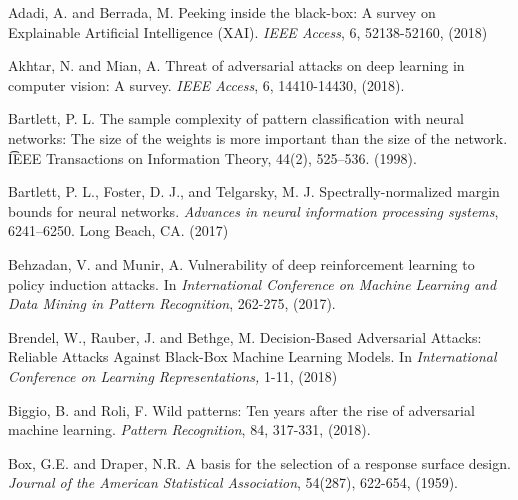 \documentclass[12pt]{article}
\begin{document}

\begin{thebibliography}{}
%

Adadi, A. and Berrada, M. Peeking inside the black-box: A survey on
Explainable Artificial Intelligence (XAI). {\it IEEE Access}, 6,
52138-52160, (2018)

Akhtar, N. and Mian, A. Threat of adversarial attacks on deep
learning in computer vision: A survey. {\it IEEE Access}, 6, 14410-14430,
(2018).

Bartlett, P. L. The sample complexity of pattern classification with
neural networks: The size of the weights is more important than the
size of the network. {\t IEEE Transactions on Information Theory},
44(2), 525–536. (1998). 

Bartlett, P. L., Foster, D. J., and Telgarsky,
M. J. Spectrally-normalized margin bounds for neural
networks. {\it Advances in neural information processing 
systems},  6241–6250. Long Beach, CA. (2017) 

 Behzadan, V. and Munir, A. Vulnerability of deep
 reinforcement learning to policy induction attacks. In {\it International
 Conference on Machine Learning and Data Mining in Pattern
 Recognition}, 262-275, (2017).   

 Brendel, W., Rauber, J. and Bethge, M. Decision-Based Adversarial
 Attacks: Reliable Attacks Against Black-Box Machine Learning
 Models. In {\it International Conference on Learning
   Representations,} 1-11, (2018)
 
Biggio, B. and Roli, F. Wild patterns: Ten years after the rise
of adversarial machine learning. {\it Pattern Recognition}, 84, 317-331, (2018).   
 
Box, G.E. and Draper, N.R. A basis for the selection of a
response surface design. {\it Journal of the American Statistical
Association}, 54(287), 622-654, (1959).


\end{thebibliography}
\end{document}
